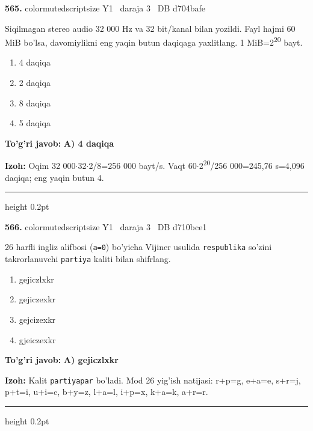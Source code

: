 \documentclass[10pt,a4paper,oneside]{article}
\begin{document}
\noindent\textbf{\color{ink}565.}  {color{muted}scriptsize Y1 \textbullet\ daraja 3 \textbullet\ DB d704bafe}
\par
Siqilmagan stereo audio 32 000 Hz va 32 bit/kanal bilan yozildi. Fayl hajmi 60 MiB bo'lsa, davomiylikni eng yaqin butun daqiqaga yaxlitlang. 1 MiB=2\textsuperscript{2}\textsuperscript{0} bayt.
\begin{enumerate}[label=\Alph*),leftmargin=9mm]
\item 4 daqiqa
\item 2 daqiqa
\item 8 daqiqa
\item 5 daqiqa
\end{enumerate}
\begin{tcolorbox}[enhanced,breakable,colback=teal!4,colframe=teal!50!black,boxrule=0.5pt,arc=1.1mm,left=3mm,right=3mm,top=1.7mm,bottom=1.7mm,before skip=2mm,after skip=2mm]
\textbf{\color{teal}To'g'ri javob:} \textbf{A) 4 daqiqa}
\par\smallskip
\textbf{Izoh:} Oqim 32 000\ensuremath{\cdot}32\ensuremath{\cdot}2/8=256 000 bayt/s. Vaqt 60\ensuremath{\cdot}2\textsuperscript{2}\textsuperscript{0}/256 000=245,76 s=4,096 daqiqa; eng yaqin butun 4.
\end{tcolorbox}
\vspace{2mm}\hrule height 0.2pt \vspace{3mm}

\noindent\textbf{\color{ink}566.}  {color{muted}scriptsize Y1 \textbullet\ daraja 3 \textbullet\ DB d710bce1}
\par
26 harfli ingliz alifbosi (\texttt{a=0}) bo'yicha Vijiner usulida \texttt{respublika} so'zini takrorlanuvchi \texttt{partiya} kaliti bilan shifrlang.
\begin{enumerate}[label=\Alph*),leftmargin=9mm]
\item gejiczlxkr
\item gejiczexkr
\item gejcizexkr
\item gjeiczexkr
\end{enumerate}
\begin{tcolorbox}[enhanced,breakable,colback=teal!4,colframe=teal!50!black,boxrule=0.5pt,arc=1.1mm,left=3mm,right=3mm,top=1.7mm,bottom=1.7mm,before skip=2mm,after skip=2mm]
\textbf{\color{teal}To'g'ri javob:} \textbf{A) gejiczlxkr}
\par\smallskip
\textbf{Izoh:} Kalit \texttt{partiyapar} bo'ladi. Mod 26 yig'ish natijasi: r+p=g, e+a=e, s+r=j, p+t=i, u+i=c, b+y=z, l+a=l, i+p=x, k+a=k, a+r=r.
\end{tcolorbox}
\vspace{2mm}\hrule height 0.2pt \vspace{3mm}
\end{document}
